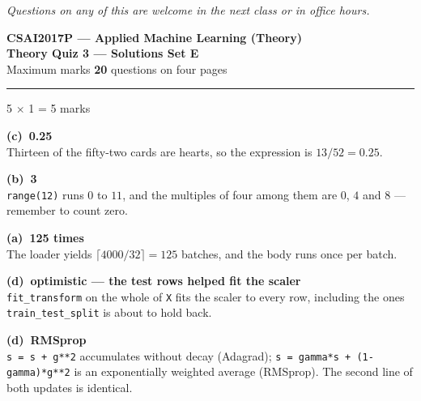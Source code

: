 \documentclass[10pt,a4paper]{article}
\newcommand{\SetLetter}{}
\newcommand{\parthead}[2]{\vspace{2pt}\noindent\rule{\linewidth}{0.4pt}\par\vspace{2pt}%
  \noindent{\bfseries Part #1}\hfill{\small #2}\par\vspace{1pt}}
\newcommand{\sol}[1]{\textbf{#1}}
\begin{document}
\vfill

{\footnotesize\itshape Questions on any of this are welcome in the next class or in office hours.}

\newpage


\renewcommand{\SetLetter}{E}\setcounter{page}{1}

\begin{center}
{\large\bfseries CSAI2017P --- Applied Machine Learning (Theory)}\\[2pt]
{\large\bfseries Theory Quiz 3 --- Solutions \quad\textbullet\quad Set E}\\[3pt]
{\small Maximum marks \textbf{20} \quad\textbullet{} questions on four pages}
\end{center}
\vspace{2pt}

\noindent{}
\vspace{3pt}


\parthead{A --- Multiple choice}{5 $\times$ 1 = 5 marks}

\begin{sA}

  \item \sol{(c)\ 0.25}\\ Thirteen of the fifty-two cards are hearts, so the expression is $13/52 = 0.25$.

  \item \sol{(b)\ 3}\\ \texttt{range(12)} runs $0$ to $11$, and the multiples of four among them are $0$, $4$ and $8$ --- remember to count zero.

  \item \sol{(a)\ 125 times}\\ The loader yields $\lceil 4000/32 \rceil = 125$ batches, and the body runs once per batch.

  \item \sol{(d)\ optimistic --- the test rows helped fit the scaler}\\ \texttt{fit\_transform} on the whole of \texttt{X} fits the scaler to every row, including the ones \texttt{train\_test\_split} is about to hold back.

  \item \sol{(d)\ RMSprop}\\ \texttt{s = s + g**2} accumulates without decay (Adagrad); \texttt{s = gamma*s + (1-gamma)*g**2} is an exponentially weighted average (RMSprop). The second line of both updates is identical.

\end{sA}
\end{document}
